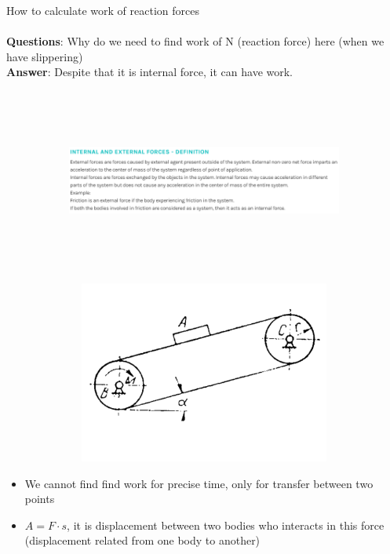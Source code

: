 \documentclass[aspectratio=169]{beamer}
\begin{document}
    \begin{frame}[t]{How to calculate work of reaction forces }
    \framesubtitle{}
        \begin{minipage}[H]{0.6\textwidth}
            \textbf{Questions}: Why do we need to find work of N (reaction 
            force) here (when we have slippering) \\
            \textbf{Answer}: Despite that it is internal force, it can have 
            work. 
        \end{minipage}
        \vspace{-0.3cm}
        \begin{figure}[H]
            \flushleft
            \begin{subfigure}[t]{0.59\textwidth}
                \includegraphics[height=6cm,width=1\textwidth,keepaspectratio]{image21.png}
                \label{fig:image21}
            \end{subfigure}
            \begin{subfigure}[t]{0.39\textwidth}
                \vspace{-3.0cm}
                \includegraphics[height=6cm,width=1\textwidth,keepaspectratio]{image2.png}
                \label{fig:image2}
            \end{subfigure}
        \end{figure}
        \begin{minipage}[H]{0.8\textwidth}
            \vspace{-2.5cm}
            \begin{itemize}
                \item We cannot find find work for precise time, only for transfer between two points
                \item $A = F \cdot s$, it is displacement between two bodies who interacts in this force 
                (displacement related from one body to another)
            \end{itemize}
        \end{minipage}
    \end{frame}
    
\end{document}
